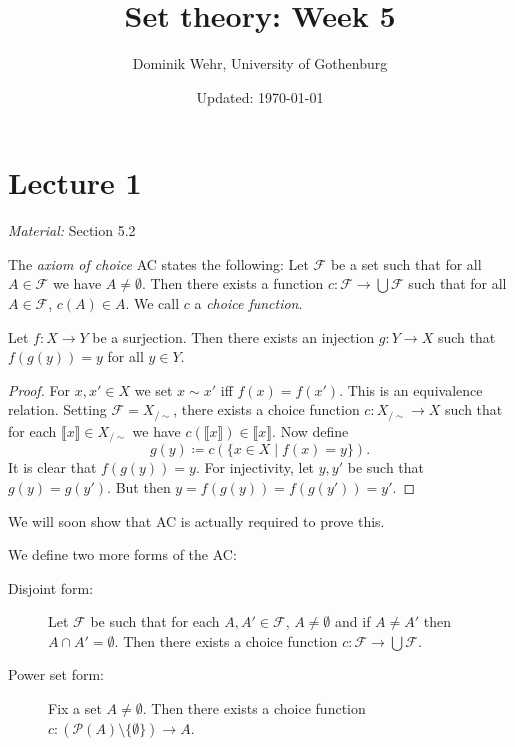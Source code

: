 \documentclass{whrartcl}
\title{Set theory: Week 5}
\author{Dominik Wehr, University of Gothenburg}
\date{Updated: \today}
\newcommand{\FF}{\mathcal{F}}
\newcommand{\pow}{\mathcal{P}}
\newcommand{\cls}[1]{\llbracket #1 \rrbracket}
\begin{document}
\maketitle

\section{Lecture 1}

\emph{Material:} Section 5.2

\begin{definition}
  The \emph{axiom of choice} \textsc{AC} states the following: Let $\FF$ be a set such that
  for all $A \in \FF$ we have $A \neq \emptyset$. Then there exists a function
  $c : \FF \to \bigcup \FF$ such that for all $A \in \FF$, $c(A) \in A$. We call
  $c$ a \emph{choice function}.
\end{definition}

\begin{lemma}
  Let $f : X \to Y$ be a surjection. Then there exists an injection $g : Y \to
  X$ such that $f(g(y)) = y$ for all $y \in Y$.
\end{lemma}
\begin{proof}
  For $x, x' \in X$ we set $x \sim x'$ iff $f(x) = f(x')$. This is an
  equivalence relation. Setting $\FF = X_{/ \sim}$, there exists a choice
  function $c : X_{/ \sim} \to X$ such that for each $\cls{x} \in X_{/ \sim}$ we
  have $c(\cls{x}) \in \cls{x}$. Now define
  \[
    g(y) \coloneq c(\{x \in X \mid f(x) = y\}).
  \]
  It is clear that $f(g(y)) = y$. For injectivity, let $y, y'$ be such that
  $g(y) = g(y')$. But then $y = f(g(y)) = f(g(y')) = y'$.
\end{proof}

\begin{remark}
  We will soon show that AC is actually required to prove this.
\end{remark}

\begin{definition}
  We define two more forms of the AC:
  \begin{description}
  \item[Disjoint form:] Let $\FF$ be such that for each $A, A' \in \FF$, $A \neq
    \emptyset$ and if $A \neq A'$ then $A \cap A' = \emptyset$. Then there
    exists a choice function $c : \FF \to \bigcup \FF$.
  \item[Power set form:] Fix a set $A \neq \emptyset$. Then there exists a
    choice function $c : (\pow(A) \setminus \{\emptyset\}) \to A$.
  \end{description}
\end{definition}
\end{document}
